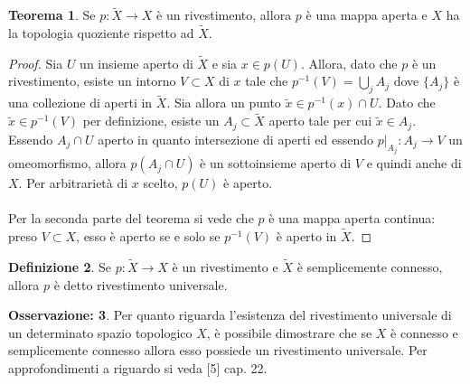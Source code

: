 \documentclass[12pt,a4paper]{report}
\theoremstyle{definition}
\newtheorem{Def}{Definizione}[chapter]
\theoremstyle{Theorem}
\newtheorem{Theo}[Def]{Teorema}
\theoremstyle{definition}
\theoremstyle{definition}
\theoremstyle{definition}
\newtheorem{Obs}[Def]{Osservazione:}
\begin{document}
\begin{center}
	
\end{center}
\begin{Theo}
	Se $p:\tilde{X}\rightarrow X$ è un rivestimento, allora $p$ è una mappa aperta e $X$ ha la topologia quoziente rispetto ad $\tilde{X}$.
\end{Theo}
\begin{proof}
	Sia $U$
 un insieme aperto di $\tilde{X}$ e sia $x\in p(U)$. Allora, dato che $p$ è un rivestimento, esiste un intorno $V\subset X$ di $x$ tale che $p^{-1}(V)=\bigcup_jA_j$ dove $\{A_j\}$ è una collezione di aperti in $\tilde{X}$. Sia allora un punto $\tilde{x}\in p^{-1}(x)\cap U$. Dato che $\tilde{x}\in p^{-1}(V)$ per definizione, esiste un $A_j\subset \tilde{X}$ aperto tale per cui $\tilde{x}\in A_j$. Essendo $A_j\cap U$ aperto in quanto intersezione di aperti ed essendo $p|_{A_j}:A_j\rightarrow V$ un omeomorfismo, allora $p(A_j\cap U)$ è un sottoinsieme aperto di $V$ e quindi anche di $X$. Per arbitrarietà di $x$ scelto, $p(U)$ è aperto.\\
 \\
 Per la seconda parte del teorema si vede che $p$ è una mappa aperta continua: preso $V\subset X$, esso è aperto se e solo se $p^{-1}(V)$ è aperto in $\tilde{X}$.  
\end{proof}
\begin{Def}
	Se $p:\tilde{X}\rightarrow X$ è un rivestimento e $\tilde{X}$ è semplicemente connesso, allora $p$ è detto rivestimento universale.
\end{Def}
\begin{Obs}
	Per quanto riguarda l'esistenza del rivestimento universale di un determinato spazio topologico $X$, è possibile dimostrare che se $X$ è connesso e semplicemente connesso allora esso possiede un rivestimento universale. Per approfondimenti a riguardo si veda [5] cap. 22.
\end{Obs}
\end{document}
